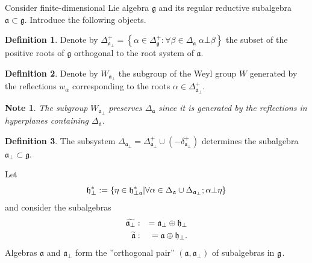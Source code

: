 \documentclass[12pt]{article}
\newtheorem{mynote}{Note}[section]
\theoremstyle{definition}
\newtheorem{definition}{Definition}
\newcommand{\af}{\mathfrak{a}}
\newcommand{\afb}{\mathfrak{a}_{\bot}}
\begin{document}
Consider finite-dimensional Lie algebra $\mathfrak{g}$  and its regular reductive subalgebra $\af\subset \mathfrak{g}$. Introduce the following objects.
\begin{definition}
  \label{def-1}
  Denote by $\Delta^{+}_{\afb}=\left\{\alpha\in \Delta^{+}_{\mathfrak{g}}:\forall \beta\in\Delta_{\af} \; \alpha\bot \beta\right\}$ the subset of the positive roots of $\mathfrak{g}$ orthogonal to the root system of $\af$.
\end{definition}

\begin{definition}
  \label{def-2}
  Denote by $W_{\afb}$ the subgroup of the Weyl group $W$ generated by the reflections $w_{\alpha}$ corresponding to the roots $\alpha\in \Delta^{+}_{\afb}$.
\end{definition}
\begin{mynote}
  The subgroup $W_{\afb}$ preserves $\Delta_{\af}$ since it is generated by the reflections in hyperplanes containing $\Delta_{\af}$.
\end{mynote}
\begin{definition}
  \label{def-3}
  The subsystem $\Delta_{\afb}=\Delta^{+}_{\afb}\cup \left(-\delta^{+}_{\afb}\right)$ determines the subalgebra $\af_{\bot}\subset \mathfrak{g}$.
\end{definition}
Let
\begin{equation*}
\frak{h}_{\perp }^{\ast }:=\left\{ \eta \in \frak{h}_{\perp \af}^{\ast
}|\forall \alpha \in \Delta _{\af}\cup \Delta _{\af_{\perp
}};\alpha \bot \eta \right\}
\end{equation*}
and consider the subalgebras
\begin{eqnarray*}
\widetilde{\af_{\perp }} &:&=\af_{\perp }\oplus \frak{h}_{\perp }
\\
\widetilde{\af} &:&=\af\oplus \frak{h}_{\perp }.
\end{eqnarray*}
Algebras $\af$ and $\af_{\perp }$ form the ''orthogonal pair''
$\left( \af,\af_{\perp}\right) $
of subalgebras in $\frak{g}$.
\end{document}

